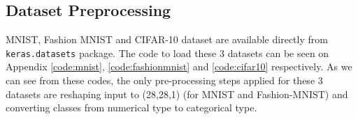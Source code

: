 \subsection{Dataset Preprocessing}
MNIST, Fashion MNIST and CIFAR-10 dataset are available directly from {\tt{keras.datasets}} package. The code to load these 3 datasets can be seen on Appendix \ref{code:mnist}, \ref{code:fashionmnist} and \ref{code:cifar10} respectively. As we can see from these codes, the only pre-processing steps applied for these 3 datasets are reshaping input to (28,28,1) (for MNIST and Fashion-MNIST) and converting classes from numerical type to categorical type.



